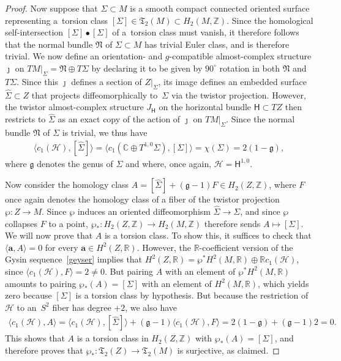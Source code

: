 \documentclass[pdftex]{sigma}
\numberwithin{equation}{section}
\def\CC{\mathbb{C}}
\def\ZZ{\mathbb{Z}}
\def\RR{\mathbb{R}}
\begin{document}
\begin{proof}
 Now suppose that $\Sigma\subset M$ is a smooth compact connected oriented surface representing a~torsion class
 $[\Sigma ] \in \mathfrak{T}_2 (M)\subset H_2 (M , \ZZ)$. Since the homological self-intersection
 $[\Sigma ] \bullet [\Sigma ]$ of a~torsion class must vanish, it therefore follows that the normal bundle $\mathfrak{N}$ of $\Sigma\subset M$
 has trivial Euler class, and is therefore trivial. We now define an orientation- and $g$-compatible almost-complex structure $\jmath$
 on $TM|_\Sigma= \mathfrak{N} \oplus T\Sigma$ by declaring it to be given by $90^\circ$ rotation in both $\mathfrak{N}$ and $T\Sigma$.
 Since this $\jmath$ defines a section of $Z|_\Sigma$, its image defines an embedded surface $\hat{\Sigma}\subset Z$
 that projects diffeomorphically to~$\Sigma$ via the twistor projection. However, the twistor almost-complex structure $J_{\mathsf{H}}$
 on the horizontal bundle $\mathsf{H}\subset TZ$ then restricts to $\hat{\Sigma}$ as an exact copy of the action of
 $\jmath$ on $TM|_\Sigma$. Since the normal bundle $\mathfrak{N}$ of $\Sigma$ is trivial, we thus have
 \begin{gather*}
\big\langle c_1 (\mathscr{H}) , [\hat{\Sigma}]\big\rangle = \big\langle c_1 (\CC \oplus T^{1,0}\Sigma ) , [{\Sigma}]\big\rangle = \chi (\Sigma ) = 2(1-\mathfrak{g}),
\end{gather*}
where $\mathfrak{g}$ denotes the genus of $\Sigma$ and where, once again, $\mathscr{H} = \mathsf{H}^{1,0}$.

Now consider the homology class $A= [\hat{\Sigma}] + (\mathfrak{g} -1) F \in H_2 (Z, \ZZ)$, where $F$ once again denotes
 the homology class of a fiber of the twistor projection $\wp\colon Z\to M$. Since $\wp$ induces an oriented diffeomorphism $\hat{\Sigma} \to \Sigma$,
 and since $\wp$ collapses $F$ to a point, $\wp_*\colon H_2(Z, \ZZ) \to H_2(M, \ZZ)$ therefore sends $A\mapsto [\Sigma ]$.
We will now prove that $A$ is a torsion class. To show this, it suffices to check that $\langle \mathbf{a} , A \rangle =0$
 for every $\mathbf{a} \in H^2(Z, \RR)$. However, the $\RR$-coefficient version of the Gysin sequence~\eqref{geyser}
 implies that $H^2 (Z, \RR)= \wp^* H^2(M, \RR)\oplus
 \RR c_1 (\mathscr{H})$, since $\langle c_1 (\mathscr{H}) , F \rangle =2\neq 0$.
But pairing $A$ with an element of $\wp^* H^2(M, \RR)$ amounts to pairing $\wp_*(A)=[\Sigma ]$ with an element of $H^2(M, \RR)$,
which yields zero because $[\Sigma ]$ is a torsion class by hypothesis. But because
 the restriction of $\mathscr{H}$ to an~$S^2$ fiber has degree $+2$, we also have
\begin{gather*}
 \langle c_1 (\mathscr{H}) , A\rangle = \big\langle c_1 (\mathscr{H}) , [\hat{\Sigma}]\big\rangle + (\mathfrak{g} -1) \langle c_1 (\mathscr{H}) , F \rangle
 = 2(1-\mathfrak{g}) + (\mathfrak{g} -1) 2 =0.
 \end{gather*}
This shows that $A$ is a torsion class in $H_2(Z, \ZZ)$ with $\wp_* (A) = [\Sigma ]$,
and therefore proves that $\wp_*\colon \mathfrak{T}_2 (Z)\to \mathfrak{T}_2 (M)$ is surjective, as claimed.
 \end{proof}
\end{document}

